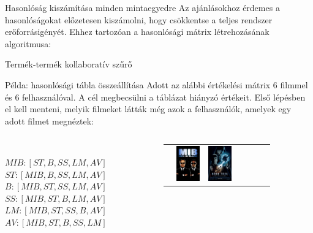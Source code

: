 \documentclass[english, aspectratio=169]{beamer}
\begin{document}
\begin{frame}{Hasonlóság kiszámítása minden mintaegyedre}
Az ajánlásokhoz érdemes a hasonlóságokat előzetesen kiszámolni, hogy csökkentse a teljes rendszer erőforrásigényét. Ehhez tartozóan a hasonlósági mátrix létrehozásának algoritmusa:
\begin{algorithm}[H]
\caption{Termék-termék kollaboratív szűrő}
\SetAlgoLined
\end{algorithm}
\end{frame}

\begin{frame}{Példa: hasonlósági tábla összeállítása}
Adott az alábbi értékelési mátrix 6 filmmel és 6 felhasználóval. A cél megbecsülni a táblázat hiányzó értékeit. Első lépésben el kell menteni, melyik filmeket látták még azok a felhasználók, amelyek egy adott filmet megnéztek:
\begin{columns}
\begin{column}{.3\textwidth}
\begin{small}
\vspace{.5cm}\\
$MIB: \left[ ST,B,SS,LM,AV \right]$\\
$ST: \left[ MIB, B, SS, LM, AV \right]$\\
$B: \left[ MIB, ST, SS, LM, AV \right]$\\
$SS: \left[ MIB, ST, B, LM, AV \right]$\\
$LM: \left[ MIB, ST, SS, B, AV \right]$\\
$AV: \left[ MIB, ST, B, SS, LM \right]$\\
\end{small}
\end{column}
\begin{column}{.8\textwidth}
\begin{center}
\begin{footnotesize}
\begin{tabular}{|c|c|c|c|c|c|c|}
\hline
& 
\includegraphics[height=1.5cm, keepaspectratio]{images/movies/men_in_black.png} &
\includegraphics[height=1.5cm, keepaspectratio]{images/movies/star_trek.png} &

\end{tabular}
\end{footnotesize}
\end{center}
\end{column}
\end{columns}
\end{frame}
\end{document}
